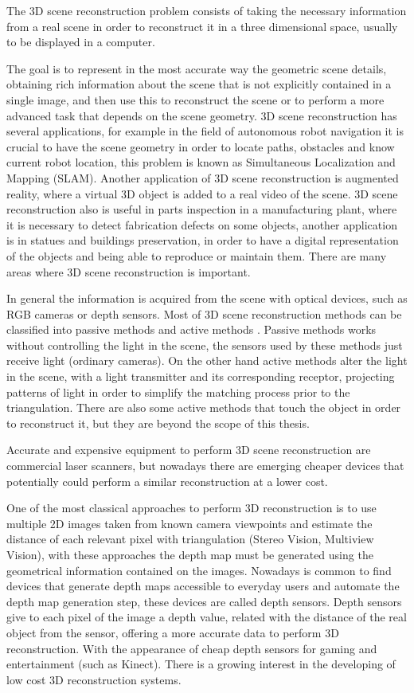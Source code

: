 \indent The 3D scene reconstruction problem consists of taking the
necessary information from a real scene in order to reconstruct
it in a three dimensional space, usually to be displayed 
in a computer. 

The goal is to represent in the most accurate way the geometric scene details, obtaining rich 
information about the scene that is not explicitly contained in a single image, and then use this 
to reconstruct the scene or to perform a more advanced task that depends on the scene geometry. 
3D scene reconstruction has several applications, for example in the field of autonomous robot navigation it is crucial to have 
the scene geometry in order to locate paths, obstacles and know current robot location, this problem is known as 
Simultaneous Localization and Mapping (SLAM). Another application of 3D scene reconstruction is augmented reality, 
where a virtual 3D object is added to a real video of the scene. 3D scene reconstruction also is useful in parts inspection 
in a manufacturing plant, where it is necessary to detect
 fabrication defects on some objects, another application is in statues and buildings preservation, in order to have a digital representation 
of the objects and being able to reproduce or maintain them. There are many areas where 3D scene reconstruction is important.

 
In general the information is acquired
 from the scene with optical devices, such as RGB cameras or depth sensors.
Most of 3D scene reconstruction methods can be classified into passive methods and active methods \cite{lanman}.
Passive methods works without controlling the light in the scene, the sensors used by these methods just receive light (ordinary cameras). 
On the other hand active methods alter the light in the scene, with a light transmitter and its corresponding 
receptor, projecting patterns of light in order to simplify the matching process prior to the triangulation. 
There are also some active methods that touch the object in order to reconstruct it, but they are beyond 
the scope of this thesis. 

Accurate and expensive equipment to perform 3D scene reconstruction are commercial laser scanners,
 but nowadays there are emerging cheaper devices that 
potentially could perform 
a similar reconstruction at a lower cost.

One of the most classical approaches to perform 3D reconstruction is to use multiple 2D
 images taken from known camera viewpoints and estimate the distance of each
 relevant pixel with triangulation (Stereo Vision, Multiview Vision), with these 
approaches the depth map must be generated using the geometrical information contained
 on the images. Nowadays is common to find devices that generate depth maps accessible
 to everyday users and automate the depth map generation step, these devices are called depth sensors. 
Depth sensors give to each pixel of the image a depth value, related
with the distance of the real object from the sensor, offering a more
accurate data to perform 3D reconstruction. With the appearance
of cheap depth sensors for gaming and entertainment (such as
Kinect). There is a growing interest in the developing of low cost
3D reconstruction systems. 


